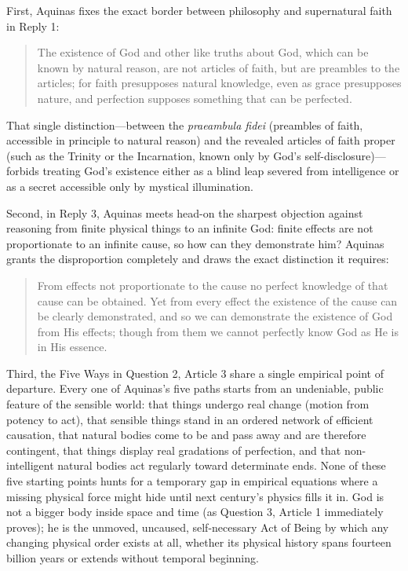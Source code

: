 First, Aquinas fixes the exact border between philosophy and supernatural faith in Reply 1:

\begin{quote}
The existence of God and other like truths about God, which can be known by natural reason, are not articles of faith, but are preambles to the articles; for faith presupposes natural knowledge, even as grace presupposes nature, and perfection supposes something that can be perfected.
\end{quote}

That single distinction---between the \emph{praeambula fidei} (preambles of faith, accessible in principle to natural reason) and the revealed articles of faith proper (such as the Trinity or the Incarnation, known only by God's self-disclosure)---forbids treating God's existence either as a blind leap severed from intelligence or as a secret accessible only by mystical illumination.

Second, in Reply 3, Aquinas meets head-on the sharpest objection against reasoning from finite physical things to an infinite God: finite effects are not proportionate to an infinite cause, so how can they demonstrate him? Aquinas grants the disproportion completely and draws the exact distinction it requires:

\begin{quote}
From effects not proportionate to the cause no perfect knowledge of that cause can be obtained. Yet from every effect the existence of the cause can be clearly demonstrated, and so we can demonstrate the existence of God from His effects; though from them we cannot perfectly know God as He is in His essence.
\end{quote}

Third, the Five Ways in Question 2, Article 3 share a single empirical point of departure. Every one of Aquinas's five paths starts from an undeniable, public feature of the sensible world: that things undergo real change (motion from potency to act), that sensible things stand in an ordered network of efficient causation, that natural bodies come to be and pass away and are therefore contingent, that things display real gradations of perfection, and that non-intelligent natural bodies act regularly toward determinate ends. None of these five starting points hunts for a temporary gap in empirical equations where a missing physical force might hide until next century's physics fills it in. God is not a bigger body inside space and time (as Question 3, Article 1 immediately proves); he is the unmoved, uncaused, self-necessary Act of Being by which any changing physical order exists at all, whether its physical history spans fourteen billion years or extends without temporal beginning.

